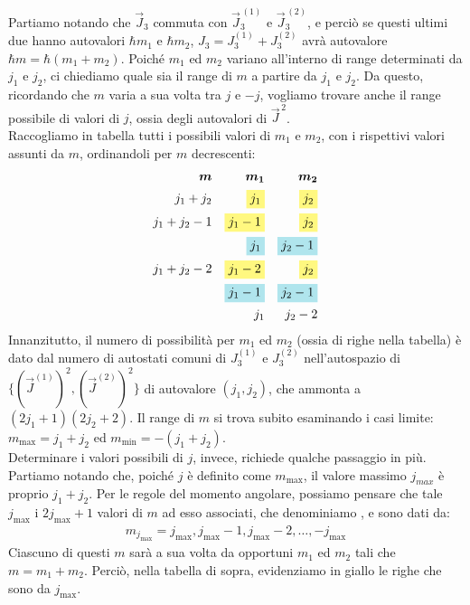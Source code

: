 \documentclass[../../FisicaTeorica.tex]{subfiles}
\begin{document}
Partiamo notando che $\vec{J}_3$ commuta con $\vec{J}^{\,(1)}_3$ e $\vec{J}^{\,(2)}_3$, e perciò se questi ultimi due hanno autovalori $\hbar m_1$ e $\hbar m_2$, $J_3 = J_3^{(1)} + J_3^{(2)}$ avrà autovalore $\hbar m = \hbar(m_1+m_2)$. Poiché $m_1$ ed $m_2$ variano all'interno di range determinati da $j_1$ e $j_2$, ci chiediamo quale sia il range di $m$ a partire da $j_1$ e $j_2$. Da questo, ricordando che $m$ varia a sua volta tra $j$ e $-j$, vogliamo trovare anche il range possibile di valori di $j$, ossia degli autovalori di $\vec{J}^{\,2}$.\\

Raccogliamo in tabella tutti i possibili valori di $m_1$ e $m_2$, con i rispettivi valori assunti da $m$, ordinandoli per $m$ decrescenti:
\begin{align*}
\bm{m} && \bm{m_1} && \bm{m_2}\\
j_1 + j_2 && \hlc{Yellow}{j_1} && \hlc{Yellow}{j_2}\\
j_1 + j_2-1 && \hlc{Yellow}{j_1-1} && \hlc{Yellow}{j_2}\\
 && \hlc{SkyBlue}{j_1} && \hlc{SkyBlue}{j_2-1}\\
 j_1+j_2-2 && \hlc{Yellow}{j_1 -2} && \hlc{Yellow}{j_2} \\
  && \hlc{SkyBlue}{j_1-1} && \hlc{SkyBlue}{j_2 -1}\\
  && j_1 && j_2 -2
\end{align*}
Innanzitutto, il numero di possibilità per $m_1$ ed $m_2$ (ossia di righe nella tabella) è dato dal numero di autostati comuni di $J_3^{(1)}$ e $J_3^{(2)}$ nell'autospazio di $\{(\vec{J}^{(1)})^2, (\vec{J}^{(2)})^2\}$ di autovalore $(j_1, j_2)$, che ammonta a \hbox{$(2j_1 +1)(2j_2 +2)$}. Il range di $m$ si trova subito esaminando i casi limite: \hbox{$m_{\max}=j_1+j_2$} ed \hbox{$m_{\min}=-(j_1+j_2)$}.\\
Determinare i valori possibili di $j$, invece, richiede qualche passaggio in più. Partiamo notando che, poiché $j$ è definito come $m_{\max}$, il valore massimo $j_{max}$ è proprio $j_1+j_2$. Per le regole del momento angolare, possiamo pensare che tale $j_{\max}$  i $2j_{\max}+1$ valori di $m$ ad esso associati, che denominiamo , e sono dati da:
\begin{align*}
m_{j_{\max}}= j_{\max}, j_{\max}-1, j_{\max} -2, \dots, -j_{\max}
\end{align*}
Ciascuno di questi $m$ sarà a sua volta  da opportuni $m_1$ ed $m_2$ tali che $m=m_1+m_2$. Perciò, nella tabella di sopra, evidenziamo in giallo le righe che sono  da $j_{\max}$.\\
\end{document}
